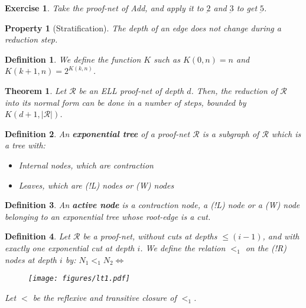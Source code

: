 \documentclass[a4paper,10pt]{article}
\newcommand{\pnet}{\mathcal{R}} %
\newtheorem{definition}{Definition}
\newtheorem{prop}{Property}
\newtheorem{thm}{Theorem}
\newtheorem{exo}{Exercise}
\begin{document}
\begin{exo}
	Take the proof-net of Add, and apply it to $\underbar{2}$ and $\underbar{3}$ to get $\underbar{5}$.
\end{exo}

\begin{prop}[Stratification]
	The depth of an edge does not change during a reduction step.
\end{prop}

\begin{definition}
	We define the function $K$ such as $K(0,n)=n$ and $K(k+1,n) = 2^{K(k,n)}$.
\end{definition}

\begin{thm}
	Let $\pnet$ be an ELL proof-net of depth $d$. Then, the reduction of $\pnet$ into its normal form can be done in a number of steps, bounded by $K(d+1, |\pnet|)$.
\label{ComplexityThm}
\end{thm}

\begin{definition}
	An \textbf{exponential tree} of a proof-net $\pnet$ is a subgraph of $\pnet$ which is a tree with:
		\begin{itemize}
			\item Internal nodes, which are contraction
			\item Leaves, which are (!L) nodes or (W) nodes
		\end{itemize}
\end{definition}

\begin{definition}
	An \textbf{active node} is a contraction node, a (!L) node or a (W) node belonging to an exponential tree whose root-edge is a cut.
\end{definition}

\begin{definition}
 Let $\pnet$ be a proof-net, without cuts at depths $\leq (i-1)$, and with exactly one exponential cut at depth $i$. We define the relation $<_{1}$ on the (!R) nodes at depth $i$ by: $N_1 <_{1} N_2 \Leftrightarrow $

\begin{figure}[h]
	\begin{center}
		\texttt{[image: figures/lt1.pdf]}
	\end{center}	
\end{figure}


 Let $<$ be the reflexive and transitive closure of $<_1$.

\end{definition}
\end{document}
